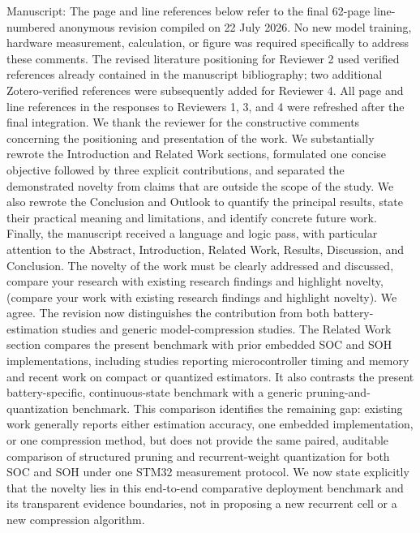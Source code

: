 \markdownRendererDocumentBegin
\markdownRendererSectionBegin
{}\markdownRendererInterblockSeparator
{}Manuscript: \markdownRendererParagraphSeparator
{}The page and line references below refer to the final 62-page line-numbered anonymous revision compiled on 22 July 2026. No new model training, hardware measurement, calculation, or figure was required specifically to address these comments. The revised literature positioning for Reviewer 2 used verified references already contained in the manuscript bibliography; two additional Zotero-verified references were subsequently added for Reviewer 4. All page and line references in the responses to Reviewers 1, 3, and 4 were refreshed after the final integration.\markdownRendererInterblockSeparator
{}\markdownRendererSectionBegin
{}\markdownRendererInterblockSeparator
{}We thank the reviewer for the constructive comments concerning the positioning and presentation of the work. We substantially rewrote the Introduction and Related Work sections, formulated one concise objective followed by three explicit contributions, and separated the demonstrated novelty from claims that are outside the scope of the study. We also rewrote the Conclusion and Outlook to quantify the principal results, state their practical meaning and limitations, and identify concrete future work. Finally, the manuscript received a language and logic pass, with particular attention to the Abstract, Introduction, Related Work, Results, Discussion, and Conclusion.\markdownRendererInterblockSeparator
{}
\markdownRendererSectionEnd \markdownRendererSectionBegin
{}\markdownRendererInterblockSeparator
{}\markdownRendererBlockQuoteBegin
The novelty of the work must be clearly addressed and discussed, compare your research with existing research findings and highlight novelty, (compare your work with existing research findings and highlight novelty).\markdownRendererBlockQuoteEnd \markdownRendererInterblockSeparator
{} We agree. The revision now distinguishes the contribution from both battery-estimation studies and generic model-compression studies. The Related Work section compares the present benchmark with prior embedded SOC and SOH implementations, including studies reporting microcontroller timing and memory and recent work on compact or quantized estimators. It also contrasts the present battery-specific, continuous-state benchmark with a generic pruning-and-quantization benchmark. This comparison identifies the remaining gap: existing work generally reports either estimation accuracy, one embedded implementation, or one compression method, but does not provide the same paired, auditable comparison of structured pruning and recurrent-weight quantization for both SOC and SOH under one STM32 measurement protocol. We now state explicitly that the novelty lies in this end-to-end comparative deployment benchmark and its transparent evidence boundaries, not in proposing a new recurrent cell or a new compression algorithm.\markdownRendererParagraphSeparator
